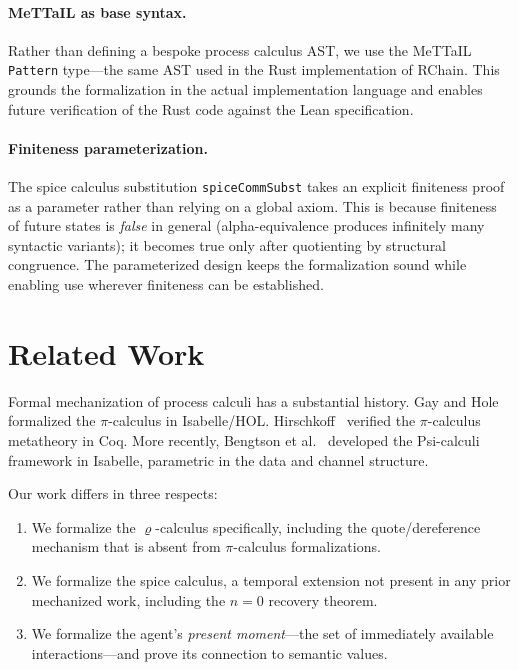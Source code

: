 \documentclass[11pt,a4paper]{article}
\theoremstyle{definition}
\theoremstyle{remark}
\renewcommand{\rho}{\varrho}
\newcommand{\lean}[1]{\lstinline[language=Lean4]{#1}}
\begin{document}
\paragraph{MeTTaIL as base syntax.}
Rather than defining a bespoke process calculus AST, we use the MeTTaIL
\lean{Pattern} type---the same AST used in the Rust implementation of RChain.
This grounds the formalization in the actual implementation language and
enables future verification of the Rust code against the Lean specification.

\paragraph{Finiteness parameterization.}
The spice calculus substitution \lean{spiceCommSubst} takes an explicit
finiteness proof as a parameter rather than relying on a global axiom.
This is because finiteness of future states is \emph{false} in general
(alpha-equivalence produces infinitely many syntactic variants); it becomes
true only after quotienting by structural congruence. The parameterized
design keeps the formalization sound while enabling use wherever finiteness
can be established.

\section{Related Work}
\label{sec:related}

Formal mechanization of process calculi has a substantial history.
Gay and Hole~\cite{gay-hole-2005} formalized the $\pi$-calculus in Isabelle/HOL.
Hirschkoff~\cite{hirschkoff1997} verified the $\pi$-calculus metatheory in Coq.
More recently, Bengtson et al.~\cite{bengtson2009} developed the Psi-calculi
framework in Isabelle, parametric in the data and channel structure.

Our work differs in three respects:
\begin{enumerate}[nosep]
  \item We formalize the $\rho$-calculus specifically, including the
    quote/dereference mechanism that is absent from $\pi$-calculus formalizations.
  \item We formalize the spice calculus, a temporal extension not present in
    any prior mechanized work, including the $n=0$ recovery theorem.
  \item We formalize the agent's \emph{present moment}---the set of immediately
    available interactions---and prove its connection to semantic values.
\end{enumerate}
\end{document}
